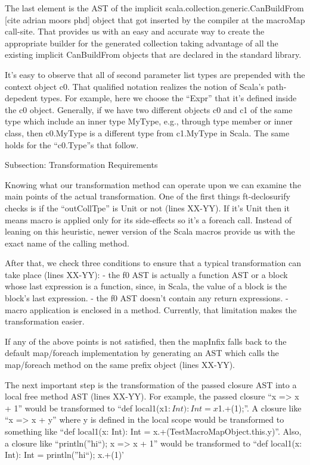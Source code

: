 The last element is the AST of the implicit
scala.collection.generic.CanBuildFrom [cite adrian moors phd] object that got
inserted by the compiler at the macroMap call-site. That provides us with an
easy and accurate way to create the appropriate builder for the generated
collection taking advantage of all the existing implicit CanBuildFrom objects
that are declared in the standard library.

It's easy to observe that all of second parameter list types are prepended
with the context object c0. That qualified notation realizes the notion of
Scala's path-depedent types. For example, here we choose the ``Expr'' that it's
defined inside the c0 object. Generally, if we have two different objects c0 and
c1 of the same type which include an inner type MyType, e.g., through type
member or inner class,  then c0.MyType is a different type from c1.MyType in
Scala. The same holds for the ``c0.Type''s that follow.


Subsection: Transformation Requirements

Knowing what our transformation method can operate upon we can examine the
main points of the actual transformation. One of the first things ft-declosurify
checks is if the ``outCollTpe'' is Unit or not (lines XX-YY). If it's Unit then
it means
macro is applied only for its side-effects so it's a foreach call. Instead of
leaning on this heuristic, newer version of the Scala macros provide us with the
exact name of the calling method.

After that, we check three conditions to ensure that a typical
transformation can take place (lines XX-YY):
- the f0 AST is actually a function AST or a block whose last
expression is a function, since, in Scala, the value of a block is the block's
last expression.
- the f0 AST doesn't contain any return expressions.
- macro application is enclosed in a method. Currently, that limitation makes
the transformation easier.

If any of the above points is not satisfied, then the mapInfix falls back to the
default map/foreach implementation by generating an AST which
calls the map/foreach method on the same prefix object (lines XX-YY).

The next important step is the transformation of the passed closure AST
into a local free method AST (lines XX-YY). For example, the passed closure ``x
=> x + 1'' would be transformed to ``def local1(x$1: Int): Int = x$1.+(1);''. A
closure like ``x => x + y'' where y is defined in the local scope would be
transformed to something like ``def local1(x: Int): Int =
x.+(TestMacroMapObject.this.y)''. Also, a closure like ``{println(''hi``); x =>
x + 1}'' would be transformed to ``def local1(x: Int): Int = {println(''hi``);
x.+(1)}'

